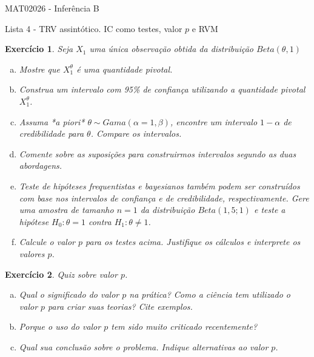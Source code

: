 \documentclass[letter,11pt]{article}
\newtheorem{exer}{Exercício}
\begin{document}
\begin{center}{ \Large MAT02026 - Inferência B }\end{center}

\begin{center}
{\large  \sc Lista 4 - TRV assintótico. IC como testes, valor $p$ e RVM}
\end{center}
\vspace{5mm}

\begin{exer} \rm
Seja $X_1$ uma única observação obtida da distribuição $Beta(\theta, 1)$
\begin{enumerate}[a)]
  \item Mostre que $X_1^{\theta}$ é uma quantidade pivotal.
  \item Construa um intervalo com 95\% de confiança utilizando a quantidade 
  pivotal $X_1^{\theta}$.
  \item Assuma *a piori* $\theta \sim Gama(\alpha=1, \beta)$, encontre um 
  intervalo $1 - \alpha$ de credibilidade para $\theta$. Compare os intervalos.
  \item Comente sobre as suposições para construirmos intervalos segundo as 
  duas abordagens.
  \item Teste de hipóteses frequentistas e bayesianos também podem ser 
  construídos com base nos intervalos de confiança e de credibilidade, 
  respectivamente. Gere uma amostra de tamanho $n=1$ da distribuição 
  $Beta(1,5; 1)$ e teste a hipótese $H_0 : \theta = 1$ contra $H_1: \theta \neq 1$.
  \item Calcule o valor $p$ para os testes acima. Justifique os cálculos e interprete os valores $p$.
\end{enumerate}
\end{exer}


\begin{exer} \rm
Quiz sobre valor $p$.  
\begin{enumerate}[a)]
  \item Qual o significado do valor $p$ na prática? Como a ciência tem utilizado o valor $p$ para criar suas teorias? Cite exemplos. 
  \item Porque o uso do valor $p$ tem sido muito criticado recentemente? 
  \item Qual sua conclusão sobre o problema. Indique alternativas ao valor $p$.
\end{enumerate}
\end{exer}
\end{document}
